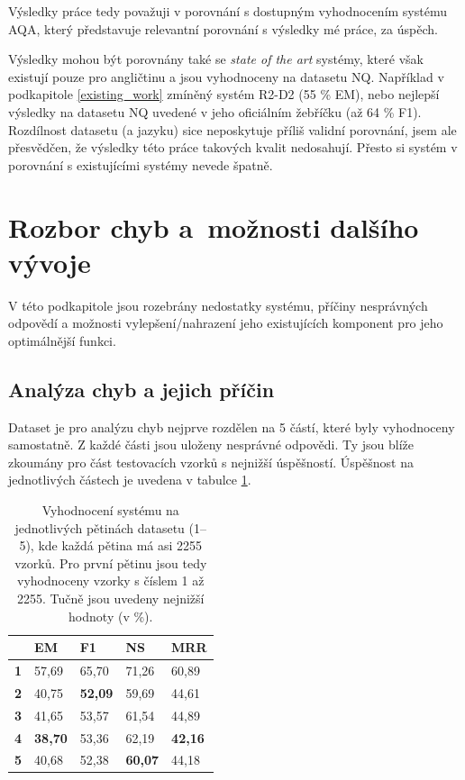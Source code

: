 Výsledky práce tedy považuji v porovnání s dostupným vyhodnocením systému AQA, který představuje relevantní porovnání s výsledky mé práce, za úspěch.\par
Výsledky mohou být porovnány také se \textit{state of the art} systémy, které však existují pouze pro angličtinu a jsou vyhodnoceny na datasetu NQ. Například v podkapitole \ref{existing_work} zmíněný systém R2-D2 (55 \% EM), nebo nejlepší výsledky na datasetu NQ uvedené v jeho oficiálním žebříčku (až 64 \% F1). Rozdílnost datasetu (a jazyku) sice neposkytuje příliš validní porovnání, jsem ale přesvědčen, že výsledky této práce takových kvalit nedosahují. Přesto si systém v porovnání s existujícími systémy nevede špatně.


\section{Rozbor chyb a~možnosti dalšího vývoje}
V této podkapitole jsou rozebrány nedostatky systému, příčiny nesprávných odpovědí a možnosti vylepšení/nahrazení jeho existujících komponent pro jeho optimálnější funkci.\par
\subsection{Analýza chyb a jejich příčin}
Dataset je pro analýzu chyb nejprve rozdělen na 5 částí, které byly vyhodnoceny samostatně. Z každé části jsou uloženy nesprávné odpovědi. Ty jsou blíže zkoumány pro část testovacích vzorků s nejnižší úspěšností. Úspěšnost na jednotlivých částech je uvedena v tabulce \ref{tab:partial_eval}.

\begin{table}[H]
\centering
\begin{tabular}{|l|l|l|l|l|}
\hline
           & \textbf{EM} & \textbf{F1} & \textbf{NS} & \textbf{MRR} \\ \hline
\textbf{1} & 57,69       & 65,70       & 71,26       & 60,89        \\ \hline
\textbf{2} & 40,75       & \textbf{52,09}       & 59,69       & 44,61        \\ \hline
\textbf{3} & 41,65       & 53,57       & 61,54       & 44,89        \\ \hline
\textbf{4} & \textbf{38,70}       & 53,36       & 62,19       & \textbf{42,16}        \\ \hline
\textbf{5} & 40,68       & 52,38       & \textbf{60,07}       & 44,18        \\ \hline
\end{tabular}
\caption{Vyhodnocení systému na jednotlivých pětinách datasetu (1--5), kde každá pětina má asi 2255 vzorků. Pro první pětinu jsou tedy vyhodnoceny vzorky s číslem 1 až 2255. Tučně jsou uvedeny nejnižší hodnoty (v \%).}
\label{tab:partial_eval}
\end{table}

